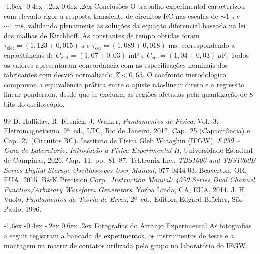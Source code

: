 \documentclass[12pt, a4paper]{article}
\makeatletter
\renewcommand\section{\@startsection {section}{1}{\z@}%
                                   {-1.6ex \@plus -0.4ex \@minus -.2ex}%
                                   {0.6ex \@plus .2ex}%
                                   {\normalfont\large\bfseries}}
\makeatother
\begin{document}
\section{Conclusões}
\vspace{-0.15cm}
O trabalho experimental caracterizou com elevado rigor a resposta transiente de circuitos RC nas escalas de $\sim 1\text{ s}$ e $\sim 1\text{ ms}$, validando plenamente as soluções da equação diferencial baseada na lei das malhas de Kirchhoff. As constantes de tempo obtidas foram $\tau_{\text{elet}} = (1{,}123 \pm 0{,}015)\text{ s}$ e $\tau_{\text{cer}} = (1{,}089 \pm 0{,}018)\text{ ms}$, correspondendo a capacitâncias de $C_{\text{elet}} = (1{,}07 \pm 0{,}03)\text{ mF}$ e $C_{\text{cer}} = (1{,}04 \pm 0{,}03)\ \mu\text{F}$. Todos os valores apresentaram concordância com as especificações nominais dos fabricantes com desvio normalizado $Z < 0{,}65$. O confronto metodológico comprovou a equivalência prática entre o ajuste não-linear direto e a regressão linear ponderada, desde que se excluam as regiões afetadas pela quantização de 8 bits do osciloscópio.

\clearpage

\begin{thebibliography}{99}
     D. Halliday, R. Resnick, J. Walker, \textit{Fundamentos de Física}, Vol.~3: Eletromagnetismo, 9ª~ed., LTC, Rio de Janeiro, 2012, Cap.~25 (Capacitância) e Cap.~27 (Circuitos RC).
     Instituto de Física Gleb Wataghin (IFGW), \textit{F\,259 -- Guia de Laboratório: Introdução à Física Experimental II}, Universidade Estadual de Campinas, 2026, Cap.~11, pp.~81--87.
     Tektronix Inc., \textit{TBS1000 and TBS1000B Series Digital Storage Oscilloscopes User Manual}, 077-0444-03, Beaverton, OR, EUA, 2015.
     B\&K Precision Corp., \textit{Instruction Manual: 4050 Series Dual Channel Function/Arbitrary Waveform Generators}, Yorba Linda, CA, EUA, 2014.
     J. H. Vuolo, \textit{Fundamentos da Teoria de Erros}, 2ª~ed., Editora Edgard Blücher, São Paulo, 1996.
\end{thebibliography}

\appendix
\section{Fotografias do Arranjo Experimental}\label{ap:fotos}
As fotografias a seguir registram a bancada de experimentos, os instrumentos de teste e a montagem na matriz de contatos utilizada pelo grupo no laboratório do IFGW.
\end{document}
